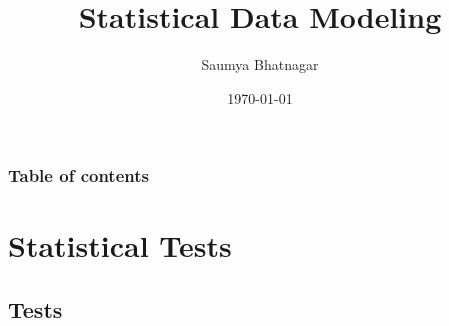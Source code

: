 \documentclass{beamer}
\begin{document}
	\title{Statistical Data Modeling}  
	\author{Saumya Bhatnagar}
	\date{\today} 
	
	
\begin{frame}
\titlepage
\end{frame}

\begin{frame}[allowframebreaks]\frametitle{Table of contents}
\tableofcontents
\end{frame} 


\section{Statistical Tests}


\subsection{Tests}
\end{document}
